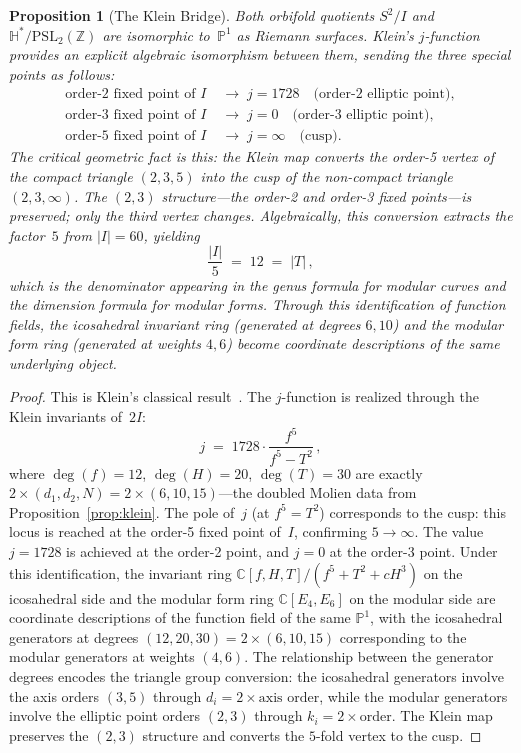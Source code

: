\documentclass[11pt,letterpaper]{article}
\newtheorem{proposition}[theorem]{Proposition}
\theoremstyle{definition}
\newcommand{\HH}{\mathbb{H}}
\newcommand{\ZZ}{\mathbb{Z}}
\newcommand{\abs}[1]{\lvert #1 \rvert}
\begin{document}
\begin{proposition}[The Klein Bridge]\label{prop:bridge}
Both orbifold quotients $S^2/I$ and $\HH^*/\mathrm{PSL}_2(\ZZ)$ are isomorphic to~$\mathbb{P}^1$ as Riemann surfaces.  Klein's $j$-function provides an explicit algebraic isomorphism between them, sending the three special points as follows:
\begin{align*}
  \text{order-2 fixed point of }I &\;\longrightarrow\; j=1728\quad\text{(order-2 elliptic point)},\\
  \text{order-3 fixed point of }I &\;\longrightarrow\; j=0\quad\text{(order-3 elliptic point)},\\
  \text{order-5 fixed point of }I &\;\longrightarrow\; j=\infty\quad\text{(cusp)}.
\end{align*}
The critical geometric fact is this: the Klein map converts the order-5 vertex of the compact triangle $(2,3,5)$ into the cusp of the non-compact triangle $(2,3,\infty)$.  The $(2,3)$ structure---the order-2 and order-3 fixed points---is preserved; only the third vertex changes.
Algebraically, this conversion extracts the factor~$5$ from $\abs{I}=60$, yielding
\[
  \frac{\abs{I}}{5} \;=\; 12 \;=\; \abs{T}\,,
\]
which is the denominator appearing in the genus formula for modular curves and the dimension formula for modular forms.  Through this identification of function fields, the icosahedral invariant ring \textup{(}generated at degrees $6,10$\textup{)} and the modular form ring \textup{(}generated at weights $4,6$\textup{)} become coordinate descriptions of the same underlying object.
\end{proposition}
\begin{proof}
This is Klein's classical result~\cite{Klein1884}.  The $j$-function is realized through the Klein invariants of~$2I$:
\[
  j \;=\; 1728\cdot\frac{f^5}{f^5-T^2}\,,
\]
where $\deg(f)=12$, $\deg(H)=20$, $\deg(T)=30$ are exactly $2\times(d_1,d_2,N)=2\times(6,10,15)$---the doubled Molien data from Proposition~\ref{prop:klein}.  The pole of~$j$ (at $f^5=T^2$) corresponds to the cusp: this locus is reached at the order-5 fixed point of~$I$, confirming $5\to\infty$.  The value $j=1728$ is achieved at the order-2 point, and $j=0$ at the order-3 point.
Under this identification, the invariant ring $\mathbb{C}[f,H,T]/(f^5+T^2+cH^3)$ on the icosahedral side and the modular form ring $\mathbb{C}[E_4,E_6]$ on the modular side are coordinate descriptions of the function field of the same $\mathbb{P}^1$, with the icosahedral generators at degrees $(12,20,30)=2\times(6,10,15)$ corresponding to the modular generators at weights $(4,6)$.  The relationship between the generator degrees encodes the triangle group conversion: the icosahedral generators involve the axis orders $(3,5)$ through $d_i=2\times\text{axis order}$, while the modular generators involve the elliptic point orders $(2,3)$ through $k_i=2\times\text{order}$.  The Klein map preserves the $(2,3)$ structure and converts the $5$-fold vertex to the cusp.
\end{proof}
\end{document}
